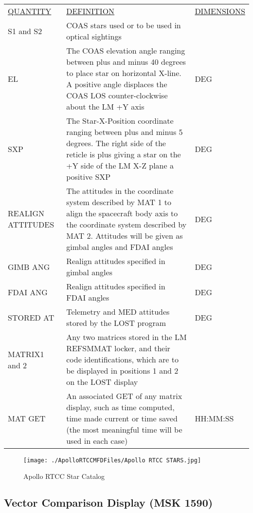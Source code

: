 \documentclass[11pt]{article} %
\begin{document}
\begin{center}
\begin{tabular}{ L{2.4cm} L{7.1cm} L{3cm} }
\underline{QUANTITY} & \underline{DEFINITION} & \underline{DIMENSIONS} \\
S1 and S2&COAS stars used or to be used in optical sightings&\\
EL&The COAS elevation angle ranging between plus and minus 40 degrees to place star on horizontal X-line. A positive angle displaces the COAS LOS counter-clockwise about the LM +Y axis&DEG\\
SXP&The Star-X-Position coordinate ranging between plus and minus 5 degrees. The right side of the reticle is plus giving a star on the +Y side of the LM X-Z plane a positive SXP&DEG\\
REALIGN ATTITUDES&The attitudes in the coordinate system described by MAT 1 to align the spacecraft body axis to the coordinate system described by MAT 2. Attitudes will be given as gimbal angles and FDAI angles&DEG\\
GIMB ANG&Realign attitudes specified in gimbal angles&DEG\\
FDAI ANG&Realign attitudes specified in FDAI angles&DEG\\
STORED AT&Telemetry and MED attitudes stored by the LOST program&DEG\\
MATRIX1 and 2&Any two matrices stored in the LM REFSMMAT locker, and their code identifications, which are to be displayed in positions 1 and 2 on the LOST display&\\
MAT GET&An associated GET of any matrix display, such as time computed, time made current or time saved (the most meaningful time will be used in each case)&HH:MM:SS\\
\end{tabular}
\end{center}

\newpage

\begin{landscape}
\begin{figure}[hbtp]
	\centering
		\texttt{[image: ./ApolloRTCCMFDFiles/Apollo RTCC STARS.jpg]}
	\caption{Apollo RTCC Star Catalog}
	\label{fig:RTCCStars}
\end{figure}
\end{landscape}
\newpage
\subsection{Vector Comparison Display (MSK 1590)}
\end{document}
